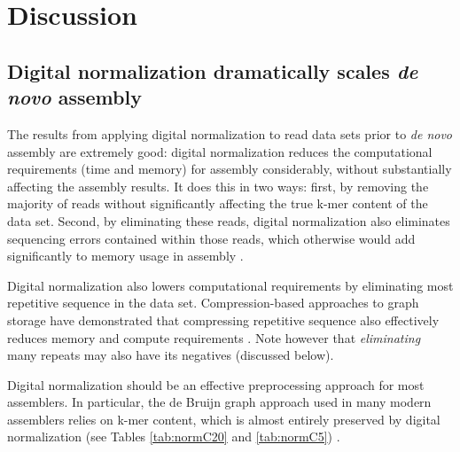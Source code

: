 \section{Discussion}

\subsection{Digital normalization dramatically scales {\em de novo} assembly}

The results from applying digital normalization to read data sets
prior to {\em de novo} assembly are extremely good: digital
normalization reduces the computational requirements (time and memory)
for assembly considerably, without substantially affecting the
assembly results.  It does this in two ways: first, by removing
the majority of reads without significantly affecting the true k-mer
content of the data set. Second, by eliminating these reads,
digital normalization also eliminates sequencing errors contained
within those reads, which otherwise would add significantly to memory
usage in assembly \cite{pubmed21245053}.

Digital normalization also lowers computational requirements by
eliminating most repetitive sequence in the data set.
Compression-based approaches to graph storage have demonstrated that
compressing repetitive sequence also effectively reduces memory and
compute requirements \cite{pubmed22139935,pubmed22156294}.  Note
however that {\em eliminating} many repeats may also have its
negatives (discussed below).

Digital normalization should be an effective preprocessing approach
for most assemblers.  In particular, the de Bruijn graph approach used
in many modern assemblers relies on k-mer content, which is almost
entirely preserved by digital normalization (see Tables \ref{tab:normC20}
and \ref{tab:normC5}) \cite{pubmed20211242}.



